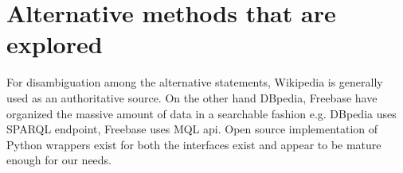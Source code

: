 \documentclass[11pt]{article}
\begin{document}
%
%
%
%
%

\section {Alternative methods that are explored}


%
%

For disambiguation among the alternative statements, Wikipedia is generally used
as an authoritative source. On the other hand DBpedia, Freebase have organized the
massive amount of data in a searchable fashion e.g. DBpedia uses SPARQL endpoint,
Freebase uses MQL api. Open source implementation of Python wrappers exist for
both the interfaces exist and appear to be mature enough for our needs.
\end{document}

